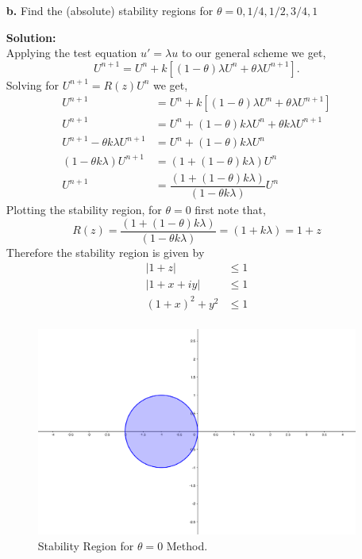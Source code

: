 \documentclass[12pt]{article}
\makeatletter
\theoremstyle{homework}
\newenvironment{exercise}[1]
{\def\@currentlabel{#1}\exercisecore}
{\endexercisecore}
\newcommand{\localhead}[1]{\par\smallskip\noindent\textbf{#1}\nobreak\\}%
\newcommand\solution{\localhead{Solution:}}
\makeatother
\begin{document}
\begin{exercise}{Problem P30}
\begin{enumerate}
    \item[\textbf{b.}] Find the (absolute) stability regions for $\theta = 0, 1/4, 1/2, 3/4, 1$
    \solution Applying the test equation $u' = \lambda u$ to our general scheme we get, 
    \begin{equation*}
      U^{n + 1} = U^n + k[(1 - \theta)\lambda U^n + \theta \lambda U^{n+1}].
    \end{equation*}
    Solving for $U^{n+1} = R(z)U^n$ we get, 
    \begin{align*}
      U^{n + 1} &= U^n + k[(1 - \theta)\lambda U^n + \theta \lambda U^{n+1}]\\
      U^{n + 1} &= U^n + (1 - \theta)k\lambda U^n + \theta k\lambda U^{n+1}\\
      U^{n + 1} - \theta k\lambda U^{n+1} &= U^n + (1 - \theta)k\lambda U^n\\
      (1 - \theta k\lambda) U^{n+1} &= (1 + (1 - \theta)k\lambda) U^n\\
     U^{n+1} &= \dfrac{(1 + (1 - \theta)k\lambda)}{ (1 - \theta k\lambda) } U^n
    \end{align*}
    Plotting the stability region, for $\theta = 0$ first note that,
    \begin{equation*}
      R(z) = \dfrac{(1 + (1 - \theta)k\lambda)}{ (1 - \theta k\lambda) } = (1 + k\lambda) = 1 + z
    \end{equation*}
    Therefore the stability region is given by 
    \begin{align*}
      |1 + z| &\leq 1\\
      |1 + x + iy| &\leq 1\\
      (1 + x)^2 + y^2 &\leq 1\\
    \end{align*}
    \begin{figure}[H]
     \begin{center}
       \caption{Stability Region for $\theta = 0$ Method.}
       \includegraphics[width=.80\textwidth]{theta1.png}
     \end{center}
    \end{figure}










\end{enumerate}
\end{exercise}
\end{document}
